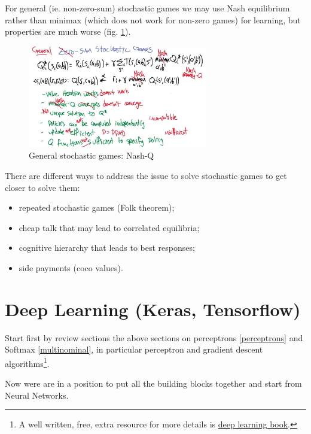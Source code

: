 \documentclass[11pt]{article}
\begin{document}
For general (ie. non-zero-sum) stochastic games we may use Nash equilibrium rather than minimax (which does not work for non-zero games) for learning, but properties are much worse (fig. \ref{general_games}).
\begin{figure}[htbp] 
	\centering
	\includegraphics[width=0.7\textwidth]{pics/general_games}
	\caption{General stochastic games: Nash-Q} 
	\label{general_games}
\end{figure}
There are different ways to address the issue to solve stochastic games to get closer to solve them:
\begin{itemize}
	\item repeated stochastic games (Folk theorem);
	\item cheap talk that may lead to correlated equilibria;
	\item cognitive hierarchy that leads to best responses;
	\item side payments (coco values).
\end{itemize}

 
\section{Deep Learning (Keras, Tensorflow)}	\label{deep_learning}
Start first by review sections the above sections on perceptrons \ref{perceptrons} and Softmax \ref{multinominal}, in particular perceptron and gradient descent algorithms\footnote{A well written, free, extra resource for more details is \href{http://neuralnetworksanddeeplearning.com/}{deep learning book}.}.

Now were are in a position to put all the building blocks together and start from Neural Networks.

\end{document}
